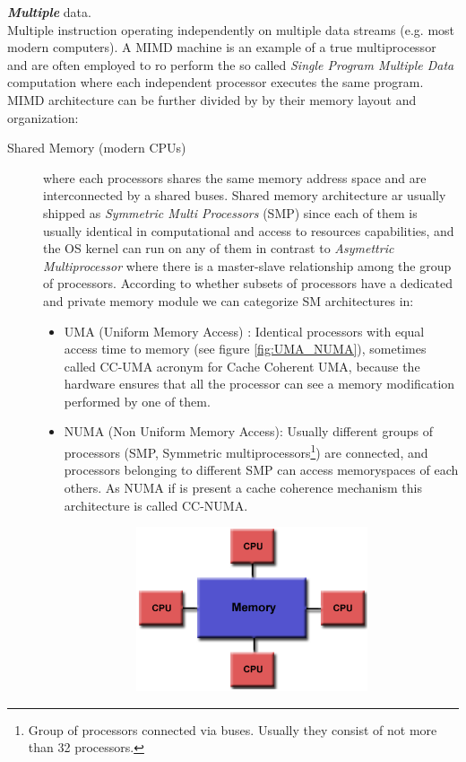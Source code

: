 \begin{description}
\textit{\textbf{Multiple}} data. \hfill \\ Multiple instruction operating
independently on multiple data streams (e.g. most modern computers). A MIMD machine is an example of a true multiprocessor and are often employed to ro perform the so called \textit{Single Program Multiple Data} computation where each independent processor executes the same program.
MIMD architecture can be further divided by by their memory layout and organization:
\begin{description}
	\item [Shared Memory (modern CPUs)] where each processors shares the same memory address space and are interconnected by a shared buses. 	Shared memory architecture ar usually shipped as \textit{Symmetric Multi Processors} (SMP) since each of them is usually identical in computational and access to resources capabilities, and the OS kernel can run on any of them in contrast to \textit{Asymettric Multiprocessor} where there is a master-slave relationship  among the group of processors. According to whether subsets of processors have a dedicated and private memory module we can categorize SM architectures in:	
	\begin{itemize}
		\item UMA (Uniform Memory Access) : Identical processors with equal
		access time to memory (see figure \ref{fig:UMA_NUMA}),
		sometimes called CC-UMA acronym for Cache Coherent UMA, because the
		hardware ensures that all the processor can see a memory modification
		performed by one of them.
		\item NUMA (Non Uniform Memory Access): Usually different groups
		of processors (SMP, Symmetric multiprocessors\footnote{Group of processors connected via buses. Usually they consist of not more than 32 processors.}) are connected, and processors belonging to different SMP can access memoryspaces of each others. As NUMA if is present a cache coherence mechanism this architecture is called CC-NUMA.
		 \begin{figure}
			\caption{Shared memory architectures.}
			\label{class12}
			\centering
			\begin{subfigure}[b]{0.5\textwidth}
				\centering
				\includegraphics[width=0.92\textwidth]{./images/parallel_programming/shared_mem}

\end{subfigure}
\end{figure}
\end{itemize}
\end{description}
\end{description}
